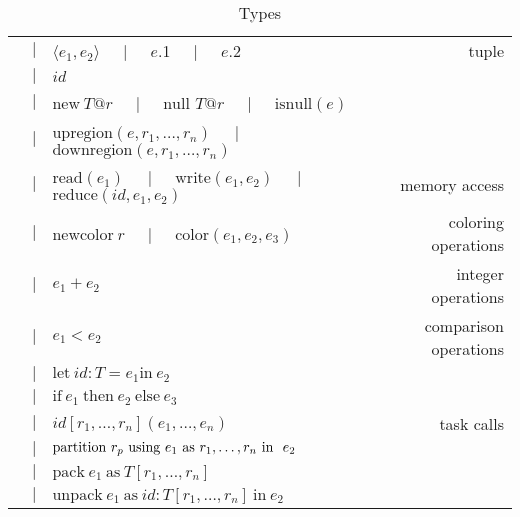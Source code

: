 \begin{table*}
{\begin{tabular}{cclr}
  &$\mid$& $\langle e_1, e_2 \rangle$ $\;\;\;\mid\;\;\;$ $e$.1 $\;\;\;\mid\;\;\;$ $e$.2 & tuple \\
  &$\mid$& $id$ &  \\
  &$\mid$& $\text{new}\ T@r$ $\;\;\;\mid\;\;\;$ $\text{null }T@r$ $\;\;\;\mid\;\;\;$ $\text{isnull}(e)$ & \\
  &$\mid$& $\text{upregion}(e, r_1,\ldots,r_n)$ $\;\;\;\mid\;\;\;$ $\text{downregion}(e, r_1,\ldots,r_n)$ & \\
  &$\mid$& $\text{read}(e_1)$ $\;\;\;\mid\;\;\;$ $\text{write}(e_1, e_2)$ $\;\;\;\mid\;\;\;$ $\text{reduce}(id, e_1, e_2)$ & memory access \\
  &$\mid$& $\text{newcolor}\ r$ $\;\;\;\mid\;\;\;$ $\text{color}(e_1, e_2, e_3)$ & coloring operations \\
  &$\mid$& $e_1 + e_2$ & integer operations \\
  &$\mid$& $e_1 < e_2$ & comparison operations \\
  &$\mid$& $\text{let}\ id : T = e_1 \text{in}\ e_2$ &  \\
  &$\mid$& $\text{if}\ e_1\ \text{then}\ e_2\ \text{else}\ e_3$ &  \\
  &$\mid$& $id[r_1, \ldots, r_n](e_1,\ldots,e_n)$ & task calls \\
  &$\mid$& $\text{partition}\ r_p\text{ using }e_1\text{ as }{r}_1,\ldots,{r}_n\text{ in }\ e_2$ &  \\
  &$\mid$& $\text{pack}\ e_1\ \text{as}\ T[r_1,\ldots,r_n]$ &  \\
  &$\mid$& $\text{unpack}\ e_1\ \text{as}\ id : T[r_1,\ldots,r_n]\ \text{in}\ e_2$ &  \\

\end{tabular}
}
\caption{Types}
\end{table*}

\newcommand{\cinfrule}[3]{\parbox{14cm}{\hfil$\infrule{#1}{#2}$\hfil}\parbox{4cm}{$\,#3$\hfil}}
\newcommand{\finfrule}[2]{\vspace{10pt}\framebox{$\infrule{#1}{#2}$}\vspace{10pt}}

\newcommand{\infx}[2]{\infrule{\begin{array}{l}{#1}\end{array}}{#2}}

\newcommand{\regionexpand}[0]{[r'_1/r_1, \ldots, r'_n/r_n]}
\newcommand{\rtriple}[3]{\left({#1},{#2},{#3}\right)}
\newcommand{\rsingle}[1]{\rtriple{#1}{\emptyset}{\top}}
\newcommand{\rtripsub}[3]{\rtriple{#1}{\Phi_{#2}}{C_{#3}}}
\newcommand{\envsub}[2]{\Gamma, \Phi_{#1}, C_{#2} \vdash}
\newcommand{\typeenv}[0]{\Gamma, \Phi, R \vdash}

